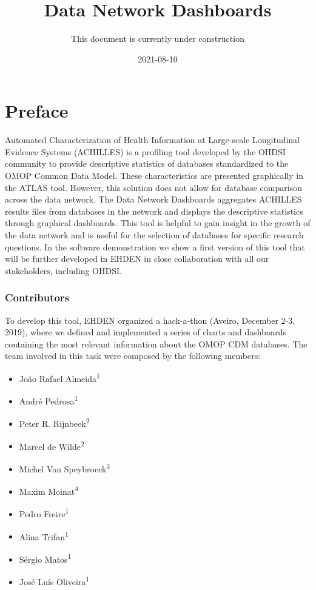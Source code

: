 \documentclass[
]{book}
\title{Data Network Dashboards}
\author{This document is currently under construction}
\date{2021-08-10}
\providecommand{\tightlist}{%
  \setlength{\itemsep}{0pt}\setlength{\parskip}{0pt}}
\begin{document}
\maketitle

{
\setcounter{tocdepth}{1}
\tableofcontents
}
\hypertarget{preface}{%
\chapter{Preface}\label{preface}}

Automated Characterization of Health Information at Large-scale Longitudinal Evidence Systems (ACHILLES) is a profiling tool developed by the OHDSI community to provide descriptive statistics of databases standardized to the OMOP Common Data Model. These characteristics are presented graphically in the ATLAS tool. However, this solution does not allow for database comparison across the data network. The Data Network Dashboards aggregates ACHILLES results files from databases in the network and displays the descriptive statistics through graphical dashboards. This tool is helpful to gain insight in the growth of the data network and is useful for the selection of databases for specific research questions. In the software demonstration we show a first version of this tool that will be further developed in EHDEN in close collaboration with all our stakeholders, including OHDSI.

\hypertarget{contributors}{%
\subsection*{Contributors}\label{contributors}}

To develop this tool, EHDEN organized a hack-a-thon (Aveiro, December 2-3, 2019), where we defined and implemented a series of charts and dashboards containing the most relevant information about the OMOP CDM databases. The team involved in this task were composed by the following members:

\begin{itemize}
\tightlist
\item
  João Rafael Almeida\textsuperscript{1}
\item
  André Pedrosa\textsuperscript{1}
\item
  Peter R. Rijnbeek\textsuperscript{2}
\item
  Marcel de Wilde\textsuperscript{2}
\item
  Michel Van Speybroeck\textsuperscript{3}
\item
  Maxim Moinat\textsuperscript{4}
\item
  Pedro Freire\textsuperscript{1}
\item
  Alina Trifan\textsuperscript{1}
\item
  Sérgio Matos\textsuperscript{1}
\item
  José Luís Oliveira\textsuperscript{1}
\end{itemize}
\end{document}
